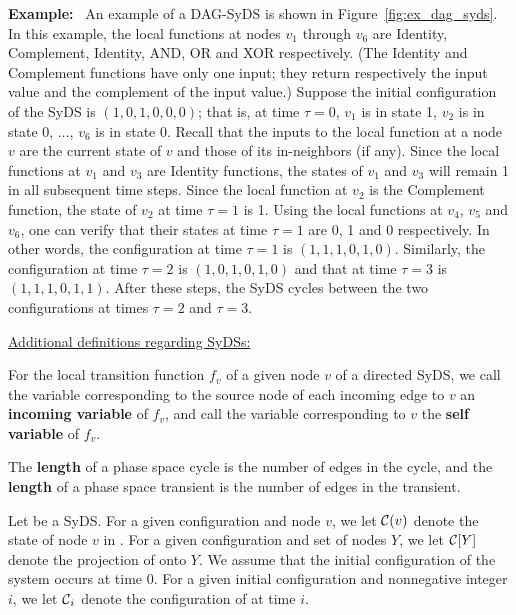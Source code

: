 \noindent
\textbf{Example:}~ An example of a DAG-SyDS is shown in
Figure~\ref{fig:ex_dag_syds}.
In this example, the local functions at nodes $v_1$ through
$v_6$ are Identity, Complement, Identity, AND, OR and
XOR respectively.
(The Identity and Complement functions have only one input;
they return respectively the input value and the complement of
the input value.)
Suppose the initial configuration of the SyDS is $(1, 0, 1, 0, 0, 0)$;
that is, at time $\tau = 0$, $v_1$ is in state 1, 
$v_2$ is in state 0, $\ldots$, $v_6$ is in state 0.
Recall that the inputs to the local function at a node $v$ are the current
state of $v$ and those of its in-neighbors (if any).
Since the local functions at $v_1$ and $v_3$ are Identity functions,
the states of $v_1$ and $v_3$ will remain 1 in all subsequent time steps.
Since the local function at $v_2$ is the Complement function, the state of
$v_2$ at time $\tau = 1$ is 1.
Using the local functions at $v_4$, $v_5$ and $v_6$, one can verify that
their states at time $\tau = 1$ are 0, 1 and 0 respectively.
In other words, the configuration at time $\tau = 1$ is 
$(1, 1, 1, 0, 1, 0)$.
Similarly, the configuration at time $\tau = 2$ is $(1, 0, 1, 0, 1, 0)$
and that at time $\tau = 3$ is $(1, 1, 1, 0, 1, 1)$.
After these steps, the SyDS cycles between the two configurations
at times $\tau =2$ and $\tau = 3$.

\smallskip
\noindent
\underline{\textsf{Additional definitions regarding SyDSs:}}~

\begin{definition}\label{def:variable_typesl}
For the local transition function $f_v$ of a given node $v$ of a directed  SyDS,
we call the variable corresponding to the source node 
of each incoming edge to $v$ an {\bf incoming variable} of $f_v$,
and call the variable corresponding to $v$ the  {\bf self variable} of $f_v$.
\end{definition}

The {\bf length} of a phase space cycle is the number of edges in the cycle,
and the {\bf length} of a phase space transient is the number of edges in the transient.

Let \cals{} be a SyDS.
For a given configuration \calc{} and node $v$,
we let $\mbox{$\mathcal{C}$}(v)$ denote the state of node $v$ in \calc{}.
For a given configuration \calc{} and set of nodes $Y$,
we let $\mbox{$\mathcal{C}$}[Y]$ denote the projection of \calc{} onto $Y$.
We assume that the initial configuration of the system 
occurs at time 0.
For a given initial configuration \calc{} and nonnegative integer $i$,
we let $\mbox{$\mathcal{C}$}_i$ denote the configuration of \cals{} at time $i$.

